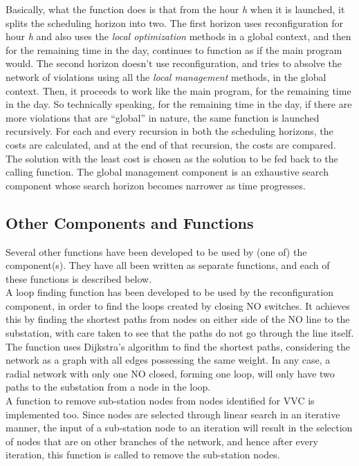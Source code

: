 Basically, what the function does is that from the hour \emph{h} when it is launched, it splits the scheduling horizon into two. The first horizon uses reconfiguration for hour \emph{h} and also uses the \emph{local optimization} methods in a global context, and then for the remaining time in the day, continues to function as if the main program would. The second horizon doesn't use reconfiguration, and tries to absolve the network of violations using all the \emph{local management} methods, in the global context. Then, it proceeds to work like the main program, for the remaining time in the day. So technically speaking, for the remaining time in the day, if there are more violations that are ``global'' in nature, the same function is launched recursively. For each and every recursion in both the scheduling horizons, the costs are calculated, and at the end of that recursion, the costs are compared. The solution with the least cost is chosen as the solution to be fed back to the calling function. The global management component is an exhaustive search component whose search horizon becomes narrower as time progresses.

\subsection{Other Components and Functions}
Several other functions have been developed to be used by (one of) the component(s). They have all been written as separate functions, and each of these functions is described below.\\

A loop finding function has been developed to be used by the reconfiguration component, in order to find the loops created by closing NO switches. It achieves this by finding the shortest paths from nodes on either side of the NO line to the substation, with care taken to see that the paths do not go through the line itself. The function uses Dijkstra's algorithm to find the shortest paths, considering the network as a graph with all edges possessing the same weight. In any case, a radial network with only one NO closed, forming one loop, will only have two paths to the substation from a node in the loop.\\

A function to remove sub-station nodes from nodes identified for VVC is implemented too. Since nodes are selected through linear search in an iterative manner, the input of a sub-station node to an iteration will result in the selection of nodes that are on other branches of the network, and hence after every iteration, this function is called to remove the sub-station nodes.\\

